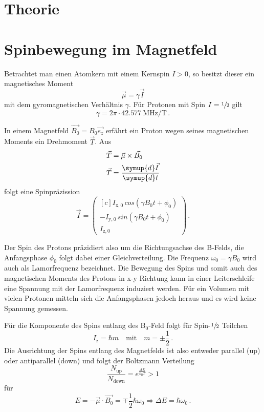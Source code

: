 \section{Theorie}

\section{Spinbewegung im Magnetfeld}

Betrachtet man einen Atomkern mit einem Kernspin $I>0$, so besitzt dieser ein magnetisches Moment
\begin{equation*}
  \vec{\mu} = \gamma \vec{I}
\end{equation*}
mit dem gyromagnetischen Verhältnis $\gamma$.
Für Protonen mit Spin $I = \sfrac{1}{2}$ gilt
\begin{equation*}
  \gamma = 2 \pi \cdot \SI{42.577}{\mega\hertz\per\tesla}\,. %
\end{equation*}

In einem Magnetfeld $\vec{B_0} = B_0 \vec{e_z}$ erfährt ein Proton wegen seines magnetischen Moments ein Drehmoment $\vec{T}$.
Aus
\begin{align*}
  \vec{T} &= \vec{\mu} \times \vec{B_0}  \\
  \vec{T} &= \frac{\symup{d}\vec{I}}{\symup{d}t}
\end{align*}
folgt eine Spinpräzission
\begin{equation}
  \vec{I} =
  \begin{pmatrix*}[c]
    I_{\text{x},0} \, cos(\gamma B_0 t + \phi_0) \\
    -I_{\text{y},0} \, sin(\gamma B_0 t + \phi_0) \\
    I_{\text{z},0}
\end{pmatrix*}
 \, .
\end{equation}

Der Spin des Protons präzidiert also um die Richtungsachse des B-Felds, die Anfangsphase $\phi_0$ folgt dabei einer Gleichverteilung.
Die Frequenz $\omega_0 = \gamma B_0$ wird auch als Lamorfrequenz bezeichnet.
Die Bewegung des Spins und somit auch des magnetischen Moments des Protons in x-y Richtung kann in einer Leiterschleife eine Spannung mit der Lamorfrequenz induziert werden.
Für ein Volumen mit vielen Protonen mitteln sich die Anfangsphasen jedoch heraus und es wird keine Spannung gemessen.


Für die Komponente des Spins entlang des B$_{0}$-Feld folgt für Spin-$\sfrac{1}{2}$ Teilchen
\begin{equation*}
  I_\text{z} = \hbar m \quad \text{mit} \quad m = \pm\frac{1}{2} \, .
\end{equation*}
Die Ausrichtung der Spins entlang des Magnetfelds ist also entweder parallel (up) oder antiparallel (down) und
folgt der Boltzmann Verteilung
\begin{equation*}
  \frac{N_\text{up}}{N_\text{down}} = e^{\frac{\Delta E}{k_\text{B} T}} > 1
\end{equation*}
für
\begin{equation*}
  E = - \vec{\mu} \cdot \vec{B_0} = \mp \frac{1}{2} \hbar \omega_0 \Rightarrow \Delta E = \hbar \omega_0 \, .
\end{equation*}

